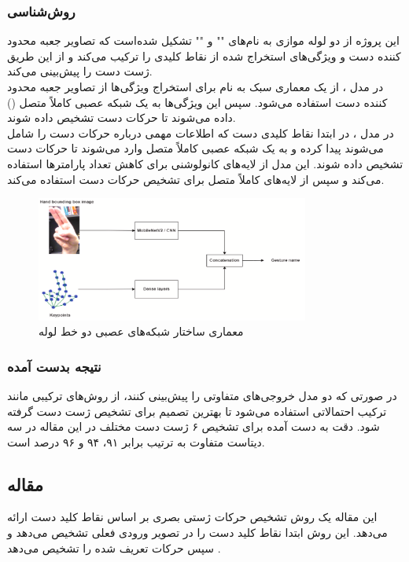 \subsubsection{روش‌شناسی}
این پروژه از دو لوله موازی به نام‌های "" و "" تشکیل شده‌است که تصاویر جعبه 
محدود کننده دست و ویژگی‌های استخراج شده از نقاط کلیدی را ترکیب می‌کند و از این طریق ژست دست را پیش‌بینی می‌کند. 
\\
در مدل ، از یک معماری سبک به نام  برای استخراج ویژگی‌ها از تصاویر جعبه 
محدود کننده دست استفاده می‌شود. سپس این ویژگی‌ها به یک شبکه عصبی کاملاً متصل () داده می‌شوند تا حرکات دست تشخیص داده شوند.
\\
در مدل  ، در ابتدا نقاط کلیدی دست  که اطلاعات مهمی درباره حرکات دست را شامل می‌شوند پیدا کرده و به یک شبکه عصبی کاملاً متصل وارد می‌شوند تا حرکات دست
تشخیص داده شوند. این مدل از لایه‌های کانولوشنی برای کاهش تعداد پارامترها استفاده می‌کند و سپس از لایه‌های کاملاً متصل برای تشخیص حرکات دست استفاده می‌کند.

\begin{figure}[h]
    \centering
    \includegraphics[width=0.8\textwidth]{keypoints_boundingBox.png}
    \caption{معماری ساختار شبکه‌های عصبی دو خط لوله}
\end{figure}


\subsubsection{نتیجه بدست آمده}
در صورتی که دو مدل خروجی‌های متفاوتی را پیش‌بینی کنند، از روش‌های ترکیبی مانند ترکیب احتمالاتی استفاده می‌شود تا بهترین تصمیم برای تشخیص ژست دست گرفته شود.
دقت به دست آمده برای تشخیص ۶ ژست دست مختلف در این مقاله در سه دیتاست متفاوت به ترتیب برابر ۹۱، ۹۴ و ۹۶ درصد است.




\subsection{مقاله }
این مقاله یک روش تشخیص حرکات ژستی بصری بر اساس نقاط کلید دست ارائه می‌دهد. این روش ابتدا نقاط کلید دست را در تصویر ورودی فعلی تشخیص می‌دهد و سپس حرکات تعریف شده را تشخیص می‌دهد \cite{chen2021visual}.

